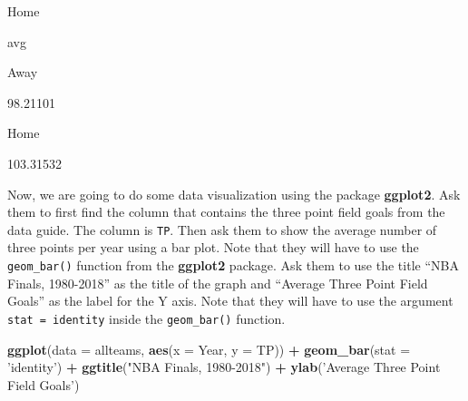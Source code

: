 \documentclass[]{book}
\newenvironment{Shaded}{\begin{snugshade}}{\end{snugshade}}
\newcommand{\CommentTok}[1]{\textcolor[rgb]{0.56,0.35,0.01}{\textit{#1}}}
\newcommand{\DataTypeTok}[1]{\textcolor[rgb]{0.13,0.29,0.53}{#1}}
\newcommand{\KeywordTok}[1]{\textcolor[rgb]{0.13,0.29,0.53}{\textbf{#1}}}
\newcommand{\NormalTok}[1]{#1}
\newcommand{\OperatorTok}[1]{\textcolor[rgb]{0.81,0.36,0.00}{\textbf{#1}}}
\newcommand{\StringTok}[1]{\textcolor[rgb]{0.31,0.60,0.02}{#1}}
\begin{document}
\begin{Shaded}
\end{Shaded}

Home

avg

Away

98.21101

Home

103.31532

Now, we are going to do some data visualization using the package \textbf{ggplot2}. Ask them to first find the column that contains the three point field goals from the data guide. The column is \texttt{TP}. Then ask them to show the average number of three points per year using a bar plot. Note that they will have to use the \texttt{geom\_bar()} function from the \textbf{ggplot2} package. Ask them to use the title ``NBA Finals, 1980-2018'' as the title of the graph and ``Average Three Point Field Goals'' as the label for the Y axis. Note that they will have to use the argument \texttt{stat\ =\ \textquotesingle{}identity\textquotesingle{}} inside the \texttt{geom\_bar()} function.

\begin{Shaded}
\begin{Highlighting}[]
\KeywordTok{ggplot}\NormalTok{(}\DataTypeTok{data =}\NormalTok{ allteams, }\KeywordTok{aes}\NormalTok{(}\DataTypeTok{x =}\NormalTok{ Year, }\DataTypeTok{y =}\NormalTok{ TP)) }\OperatorTok{+}\StringTok{ }
\StringTok{    }\KeywordTok{geom_bar}\NormalTok{(}\DataTypeTok{stat =} \StringTok{'identity'}\NormalTok{) }\OperatorTok{+}
\StringTok{    }\KeywordTok{ggtitle}\NormalTok{(}\StringTok{"NBA Finals, 1980-2018"}\NormalTok{) }\OperatorTok{+}
\StringTok{    }\KeywordTok{ylab}\NormalTok{(}\StringTok{'Average Three Point Field Goals'}\NormalTok{) }
\end{Highlighting}
\end{Shaded}
\end{document}
